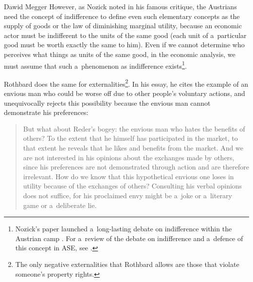\begin{artengenv}{Dawid Megger}
However, as Nozick 
\parencite*[][]{nozick_austrian_1977} %
 noted in his famous critique, the Austrians need the concept of indifference to define even such elementary concepts as the supply of goods or the law of diminishing marginal utility, because an economic actor must be indifferent to the units of the same good (each unit of a~particular good must be worth exactly the same to him). Even if we cannot determine who perceives what things as units of the same good, in the economic analysis, we must assume that such a~phenomenon as indifference exists\footnote{Nozick's paper launched a~long-lasting debate on indifference within the Austrian camp 
\parencites[see e.g.,][]{block_robert_1980}[][]{block_rejoinder_2009}[][]{block_rejoinder_2010}[][]{hoppe_note_2005}[][]{hoppe_further_2009}[][]{machaj_praxeological_2007}[][]{wysocki_indifference_2016}[][]{wysocki_note_2017}. %
 For a~review of the debate on indifference and a~defence of this concept in ASE, see 
\parencite[][]{wysocki_austro-libertarian_2021}.%
}.



Rothbard does the same for externalities\footnote{The only negative externalities that Rothbard allows are those that violate someone's property rights.}. In his essay, he cites the example of an envious man who could be worse off due to other people's voluntary actions, and unequivocally rejects this possibility because the envious man cannot demonstrate his preferences:



\begin{quote}
But what about Reder's bogey: the envious man who hates the benefits of others? To the extent that he himself has participated in the market, to that extent he reveals that he likes and benefits from the market. And we are not interested in his opinions about the exchanges made by others, since his preferences are not demonstrated through action and are therefore irrelevant. How do we know that this hypothetical envious one loses in utility because of the exchanges of others? Consulting his verbal opinions does not suffice, for his proclaimed envy might be a~joke or a~literary game or a~deliberate lie. 
\parencite[][p.320]{rothbard_present_2011}%
\end{quote}





\end{artengenv}
